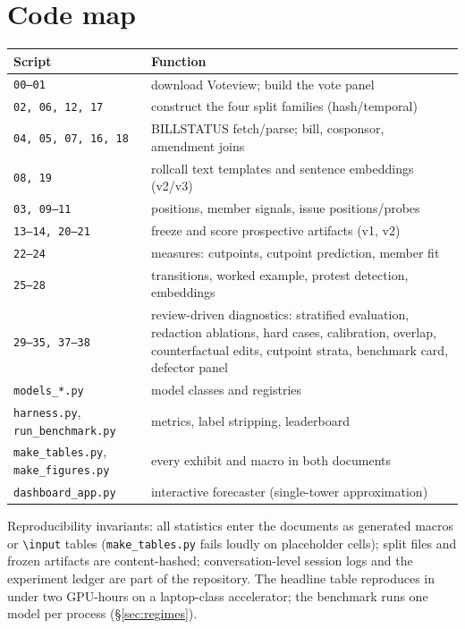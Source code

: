 \documentclass[11pt]{article}
\newcommand{\code}[1]{\texttt{#1}}
\begin{document}
\section{Code map}
\label{sec:code}

\begin{center}
{\footnotesize
\begin{tabular}{lp{8.6cm}}
\toprule
Script & Function \\
\midrule
\code{00--01} & download Voteview; build the vote panel \\
\code{02, 06, 12, 17} & construct the four split families (hash/temporal) \\
\code{04, 05, 07, 16, 18} & BILLSTATUS fetch/parse; bill, cosponsor,
amendment joins \\
\code{08, 19} & rollcall text templates and sentence embeddings (v2/v3) \\
\code{03, 09--11} & positions, member signals, issue positions/probes \\
\code{13--14, 20--21} & freeze and score prospective artifacts (v1, v2) \\
\code{22--24} & measures: cutpoints, cutpoint prediction, member fit \\
\code{25--28} & transitions, worked example, protest detection,
embeddings \\
\code{29--35, 37--38} & review-driven diagnostics: stratified evaluation,
redaction ablations, hard cases, calibration, overlap, counterfactual
edits, cutpoint strata, benchmark card, defector panel \\
\code{models\_*.py} & model classes and registries \\
\code{harness.py}, \code{run\_benchmark.py} & metrics, label stripping,
leaderboard \\
\code{make\_tables.py}, \code{make\_figures.py} & every exhibit and
macro in both documents \\
\code{dashboard\_app.py} & interactive forecaster (single-tower
approximation) \\
\bottomrule
\end{tabular}}
\end{center}

Reproducibility invariants: all statistics enter the documents as
generated macros or \code{\textbackslash input} tables
(\code{make\_tables.py} fails loudly on placeholder cells); split files
and frozen artifacts are content-hashed; conversation-level session logs
and the experiment ledger are part of the repository. The headline table
reproduces in under two GPU-hours on a laptop-class accelerator; the
benchmark runs one model per process (\S\ref{sec:regimes}).



\end{document}
